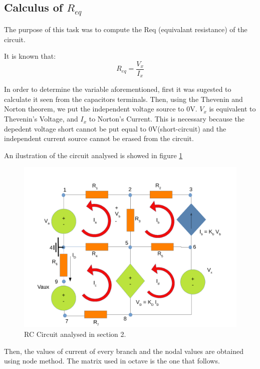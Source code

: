 \subsection{Calculus of $R_{eq}$}
\label{subsection:2.2}

\par The purpose of this task was to compute the Req (equivalant resistance) of the circuit.

It is known that:
\begin{equation}
R_{eq}=\frac{V_{x}}{I_{x}}
\end{equation}

In order to determine the variable aforementioned, first it was sugested to calculate it seen from the capacitors terminals. Then, using the Thevenin and Norton theorem, we put the independent voltage source to 0V. $V_{x}$ is equivalent to Thevenin's Voltage, and $I_{x}$ to Norton's Current. This is necessary because the depedent voltage short cannot be put equal to 0V(short-circuit) and the independent current source cannot be erased from the circuit.
\par An ilustration of the circuit analysed is showed in figure \ref{sim2draw} 
\begin{figure}[h] \centering
\includegraphics[width=0.8\linewidth]{sim2draw.pdf}
\caption{RC Circuit analysed in section 2.}
\label{sim2draw}
\end{figure}
\par
Then, the values of current of  every branch and the nodal values are obtained using node method. The matrix used in octave is the one that follows.

